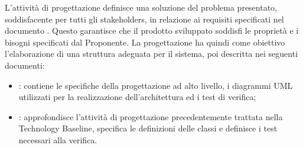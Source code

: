                      
        L'attività di progettazione definisce una soluzione del problema presentato, soddisfacente per tutti gli stakeholders, in relazione ai requisiti specificati nel documento \AdR{}. Questo garantisce che il prodotto sviluppato soddisfi le proprietà e i bisogni specificati dal Proponente. 
        La progettazione ha quindi come obiettivo l'elaborazione di una struttura adeguata per il sistema, poi descritta nei seguenti documenti:
        \begin{itemize}
           	\item{\textbf{\TB{}}: contiene le specifiche della progettazione ad alto livello, i diagrammi UML utilizzati per la realizzazione dell'architettura ed i test di verifica;}
			\item{\textbf{\PB{}}: approfondisce l'attività di progettazione precedentemente trattata nella Technology Baseline, specifica le definizioni delle classi e definisce i test necessari alla verifica.}
   		\end{itemize}
  
